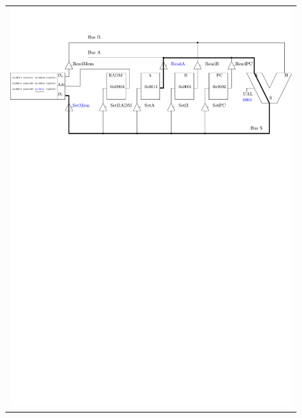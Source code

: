 \begin{figure}[htbp]
\begin{tabular}{c}
\includegraphics[width=\linewidth]{Figs/premier_chemin_sta3.pdf}\\

\end{tabular}
\end{figure}
